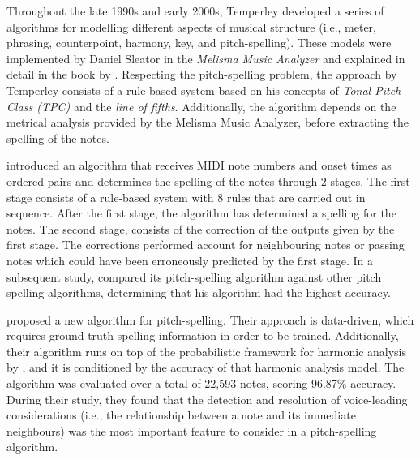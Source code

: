 Throughout the late 1990s and early 2000s, Temperley
developed a series of algorithms for modelling different
aspects of musical structure (i.e., meter, phrasing,
counterpoint, harmony, key, and pitch-spelling). These
models were implemented by Daniel Sleator in the
\emph{Melisma Music Analyzer} and explained in detail in the
book by \textcite{temperley2004cognition}. Respecting the
pitch-spelling problem, the approach by Temperley consists
of a rule-based system based on his concepts of \emph{Tonal
Pitch Class (TPC)} and the \emph{line of fifths}.
Additionally, the algorithm depends on the metrical analysis
provided by the Melisma Music Analyzer, before extracting
the spelling of the notes.

\textcite{meredith2003pitch} introduced an algorithm that
receives MIDI note numbers and onset times as ordered pairs
and determines the spelling of the notes through 2 stages.
The first stage consists of a rule-based system with 8 rules
that are carried out in sequence. After the first stage, the
algorithm has determined a spelling for the notes. The
second stage, consists of the correction of the outputs
given by the first stage. The corrections performed account
for neighbouring notes or passing notes which could have
been erroneously predicted by the first stage. In a
subsequent study, \textcite{meredith2005comparing} compared
its pitch-spelling algorithm against other pitch spelling
algorithms, determining that his algorithm had the highest
accuracy.

\textcite{stoddard2004welltempered} proposed a new algorithm
for pitch-spelling. Their approach is data-driven, which
requires ground-truth spelling information in order to be
trained. Additionally, their algorithm runs on top of the
probabilistic framework for harmonic analysis by
\textcite{raphael2003harmonic}, and it is conditioned by the
accuracy of that harmonic analysis model. The algorithm was
evaluated over a total of 22,593 notes, scoring 96.87\%
accuracy. During their study, they found that the detection
and resolution of voice-leading considerations (i.e., the
relationship between a note and its immediate neighbours)
was the most important feature to consider in a
pitch-spelling algorithm.

